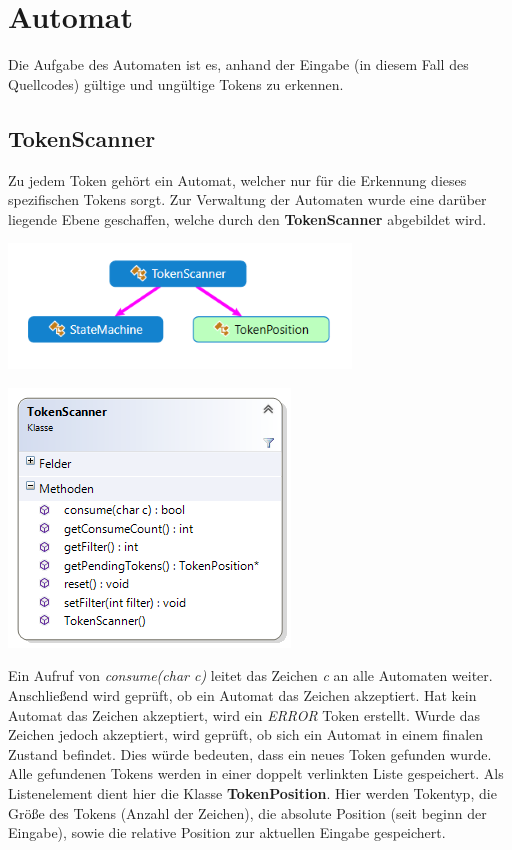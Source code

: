 \documentclass[
a4paper
]{scrreprt}
\begin{document}
	    \section{Automat}
	Die Aufgabe des Automaten ist es, anhand der Eingabe (in diesem Fall des Quellcodes) gültige und ungültige Tokens zu erkennen.
	
	\subsection{TokenScanner}
	Zu jedem Token gehört ein Automat, welcher nur für die Erkennung dieses spezifischen Tokens sorgt. Zur Verwaltung der Automaten wurde eine darüber liegende Ebene geschaffen, welche durch den \textbf{TokenScanner} abgebildet wird.
	\begin{center}
		\includegraphics{./images/tokenscanner_dependency.png}		
	\end{center}
	\begin{center}		
		\includegraphics{./images/tokenscanner_cd.png}
	\end{center}
	Ein Aufruf von \textit{consume(char c)} leitet das Zeichen \textit{c} an alle Automaten weiter. Anschließend wird geprüft, ob ein Automat das Zeichen akzeptiert. Hat kein Automat das Zeichen akzeptiert, wird ein \textit{ERROR} Token erstellt. Wurde das Zeichen jedoch akzeptiert, wird geprüft, ob sich ein Automat in einem finalen Zustand befindet. Dies würde bedeuten, dass ein neues Token gefunden wurde. Alle gefundenen Tokens werden in einer doppelt verlinkten Liste gespeichert. Als Listenelement dient hier die Klasse \textbf{TokenPosition}.	Hier werden Tokentyp, die Größe des Tokens (Anzahl der Zeichen), die absolute Position (seit beginn der Eingabe), sowie die relative Position zur aktuellen Eingabe gespeichert.
	
\end{document}
